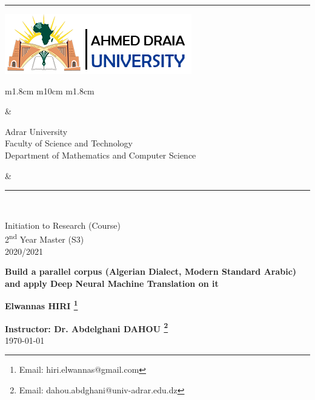\documentclass[paper=a4, fontsize=11pt]{scrartcl}
\numberwithin{equation}{section}		%
\numberwithin{figure}{section}			%
\numberwithin{table}{section}				%
\newcommand{\horrule}[1]{\rule{\linewidth}{#1}} 	%
\begin{document}
		
{\flushleft\horrule{2pt}
\begin{center}
{\includegraphics[height=0.09\textwidth]{Figs/logo_english.png}} 
\begin{tabular}{ m{1.8cm} m{10cm} m{1.8cm}}
\begin{center}
\end{center}
&
\begin{center} 
{\small
{Adrar University} \\
{Faculty of Science and Technology} \\
{Department of Mathematics and Computer Science}} \\

\end{center}
&

\begin{center}
\end{center}
\end{tabular}
\end{center}
\flushleft \horrule{2pt}\\[1cm]
}


\begin{center}

{
\huge  
Initiation to Research (Course) \\
\vspace{0.2cm}
2\textsuperscript{nd} Year Master (S3) \\
\vspace{0.2cm}
2020/2021}\\

\vspace{1cm}

{
\Huge   
\textbf{Build a parallel corpus (Algerian Dialect,  Modern Standard Arabic) and apply Deep Neural Machine Translation on it }}\\
\vspace{1cm}

{
\Large
\textbf{Elwannas HIRI \footnote{Email: hiri.elwannas@gmail.com}}}\\
\vspace{3cm}

{
\large
\textbf{Instructor: Dr. Abdelghani DAHOU \footnote{Email: dahou.abdghani@univ-adrar.edu.dz}}}\\
\today
\end{center}
\pagebreak
\tableofcontents
\pagebreak 
\listoffigures
\pagebreak
\end{document}
